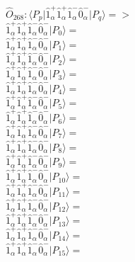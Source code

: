\documentclass[14pt]{article}
\begin{document}
    $\hat{O}_{268}:  \langle{P_p}\vert \hat{1}_{\alpha}^{+}\hat{1}_{\alpha}^{+}\hat{1}_{\alpha}^{-}\hat{0}_{\alpha}^{-} \vert{P_q}\rangle => $ \\ 
    $ \hat{1}_{\alpha}^{+}\hat{1}_{\alpha}^{+}\hat{1}_{\alpha}^{-}\hat{0}_{\alpha}^{-} \vert{P_{0}}\rangle =  $ \\ 
    $ \hat{1}_{\alpha}^{+}\hat{1}_{\alpha}^{+}\hat{1}_{\alpha}^{-}\hat{0}_{\alpha}^{-} \vert{P_{1}}\rangle =  $ \\ 
    $ \hat{1}_{\alpha}^{+}\hat{1}_{\alpha}^{+}\hat{1}_{\alpha}^{-}\hat{0}_{\alpha}^{-} \vert{P_{2}}\rangle =  $ \\ 
    $ \hat{1}_{\alpha}^{+}\hat{1}_{\alpha}^{+}\hat{1}_{\alpha}^{-}\hat{0}_{\alpha}^{-} \vert{P_{3}}\rangle =  $ \\ 
    $ \hat{1}_{\alpha}^{+}\hat{1}_{\alpha}^{+}\hat{1}_{\alpha}^{-}\hat{0}_{\alpha}^{-} \vert{P_{4}}\rangle =  $ \\ 
    $ \hat{1}_{\alpha}^{+}\hat{1}_{\alpha}^{+}\hat{1}_{\alpha}^{-}\hat{0}_{\alpha}^{-} \vert{P_{5}}\rangle =  $ \\ 
    $ \hat{1}_{\alpha}^{+}\hat{1}_{\alpha}^{+}\hat{1}_{\alpha}^{-}\hat{0}_{\alpha}^{-} \vert{P_{6}}\rangle =  $ \\ 
    $ \hat{1}_{\alpha}^{+}\hat{1}_{\alpha}^{+}\hat{1}_{\alpha}^{-}\hat{0}_{\alpha}^{-} \vert{P_{7}}\rangle =  $ \\ 
    $ \hat{1}_{\alpha}^{+}\hat{1}_{\alpha}^{+}\hat{1}_{\alpha}^{-}\hat{0}_{\alpha}^{-} \vert{P_{8}}\rangle =  $ \\ 
    $ \hat{1}_{\alpha}^{+}\hat{1}_{\alpha}^{+}\hat{1}_{\alpha}^{-}\hat{0}_{\alpha}^{-} \vert{P_{9}}\rangle =  $ \\ 
    $ \hat{1}_{\alpha}^{+}\hat{1}_{\alpha}^{+}\hat{1}_{\alpha}^{-}\hat{0}_{\alpha}^{-} \vert{P_{10}}\rangle =  $ \\ 
    $ \hat{1}_{\alpha}^{+}\hat{1}_{\alpha}^{+}\hat{1}_{\alpha}^{-}\hat{0}_{\alpha}^{-} \vert{P_{11}}\rangle =  $ \\ 
    $ \hat{1}_{\alpha}^{+}\hat{1}_{\alpha}^{+}\hat{1}_{\alpha}^{-}\hat{0}_{\alpha}^{-} \vert{P_{12}}\rangle =  $ \\ 
    $ \hat{1}_{\alpha}^{+}\hat{1}_{\alpha}^{+}\hat{1}_{\alpha}^{-}\hat{0}_{\alpha}^{-} \vert{P_{13}}\rangle =  $ \\ 
    $ \hat{1}_{\alpha}^{+}\hat{1}_{\alpha}^{+}\hat{1}_{\alpha}^{-}\hat{0}_{\alpha}^{-} \vert{P_{14}}\rangle =  $ \\ 
    $ \hat{1}_{\alpha}^{+}\hat{1}_{\alpha}^{+}\hat{1}_{\alpha}^{-}\hat{0}_{\alpha}^{-} \vert{P_{15}}\rangle =  $ \\ 
    
\end{document}
